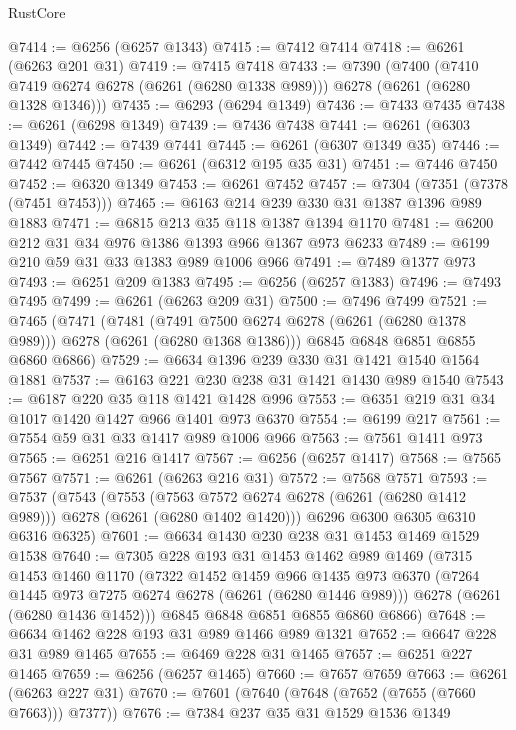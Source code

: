 \begin{lexlean}{RustCore}
\begin{coremodule}
@7414 := @6256 (@6257 @1343)
@7415 := @7412 @7414
@7418 := @6261 (@6263 @201 @31)
@7419 := @7415 @7418
@7433 := @7390
    (@7400 (@7410 @7419 @6274 @6278 (@6261 (@6280 @1338 @989))) @6278 (@6261 (@6280 @1328 @1346)))
@7435 := @6293 (@6294 @1349)
@7436 := @7433 @7435
@7438 := @6261 (@6298 @1349)
@7439 := @7436 @7438
@7441 := @6261 (@6303 @1349)
@7442 := @7439 @7441
@7445 := @6261 (@6307 @1349 @35)
@7446 := @7442 @7445
@7450 := @6261 (@6312 @195 @35 @31)
@7451 := @7446 @7450
@7452 := @6320 @1349
@7453 := @6261 @7452
@7457 := @7304 (@7351 (@7378 (@7451 @7453)))
@7465 := @6163 @214 @239 @330 @31 @1387 @1396 @989 @1883
@7471 := @6815 @213 @35 @118 @1387 @1394 @1170
@7481 := @6200 @212 @31 @34 @976 @1386 @1393 @966 @1367 @973 @6233
@7489 := @6199 @210 @59 @31 @33 @1383 @989 @1006 @966
@7491 := @7489 @1377 @973
@7493 := @6251 @209 @1383
@7495 := @6256 (@6257 @1383)
@7496 := @7493 @7495
@7499 := @6261 (@6263 @209 @31)
@7500 := @7496 @7499
@7521 := @7465
    (@7471
      (@7481 (@7491 @7500 @6274 @6278 (@6261 (@6280 @1378 @989))) @6278 (@6261 (@6280 @1368 @1386)))
      @6845
      @6848
      @6851
      @6855
      @6860
      @6866)
@7529 := @6634 @1396 @239 @330 @31 @1421 @1540 @1564 @1881
@7537 := @6163 @221 @230 @238 @31 @1421 @1430 @989 @1540
@7543 := @6187 @220 @35 @118 @1421 @1428 @996
@7553 := @6351 @219 @31 @34 @1017 @1420 @1427 @966 @1401 @973 @6370
@7554 := @6199 @217
@7561 := @7554 @59 @31 @33 @1417 @989 @1006 @966
@7563 := @7561 @1411 @973
@7565 := @6251 @216 @1417
@7567 := @6256 (@6257 @1417)
@7568 := @7565 @7567
@7571 := @6261 (@6263 @216 @31)
@7572 := @7568 @7571
@7593 := @7537
    (@7543
      (@7553 (@7563 @7572 @6274 @6278 (@6261 (@6280 @1412 @989))) @6278 (@6261 (@6280 @1402 @1420)))
      @6296
      @6300
      @6305
      @6310
      @6316
      @6325)
@7601 := @6634 @1430 @230 @238 @31 @1453 @1469 @1529 @1538
@7640 := @7305
    @228
    @193
    @31
    @1453
    @1462
    @989
    @1469
    (@7315
      @1453
      @1460
      @1170
      (@7322
        @1452
        @1459
        @966
        @1435
        @973
        @6370
        (@7264 @1445 @973 @7275 @6274 @6278 (@6261 (@6280 @1446 @989)))
        @6278
        (@6261 (@6280 @1436 @1452)))
      @6845
      @6848
      @6851
      @6855
      @6860
      @6866)
@7648 := @6634 @1462 @228 @193 @31 @989 @1466 @989 @1321
@7652 := @6647 @228 @31 @989 @1465
@7655 := @6469 @228 @31 @1465
@7657 := @6251 @227 @1465
@7659 := @6256 (@6257 @1465)
@7660 := @7657 @7659
@7663 := @6261 (@6263 @227 @31)
@7670 := @7601 (@7640 (@7648 (@7652 (@7655 (@7660 @7663))) @7377))
@7676 := @7384 @237 @35 @31 @1529 @1536 @1349

\end{coremodule}
\end{lexlean}
